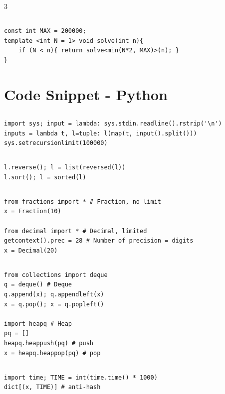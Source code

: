 \documentclass[landscape, 8pt, a4paper, oneside]{extarticle}
\begin{document}
\begin{multicols*}{3}
\subsection{}
\begin{verbatim}
const int MAX = 200000;
template <int N = 1> void solve(int n){
	if (N < n){ return solve<min(N*2, MAX)>(n); }
}
\end{verbatim}
\section{Code Snippet - Python}
\subsection{}
\begin{verbatim}
import sys; input = lambda: sys.stdin.readline().rstrip('\n')
inputs = lambda t, l=tuple: l(map(t, input().split()))
sys.setrecursionlimit(100000)
\end{verbatim}
\subsection{}
\begin{verbatim}
l.reverse(); l = list(reversed(l))
l.sort(); l = sorted(l)
\end{verbatim}
\subsection{}
\begin{verbatim}
from fractions import * # Fraction, no limit
x = Fraction(10)

from decimal import * # Decimal, limited
getcontext().prec = 28 # Number of precision = digits
x = Decimal(20)
\end{verbatim}
\subsection{}
\begin{verbatim}
from collections import deque
q = deque() # Deque
q.append(x); q.appendleft(x)
x = q.pop(); x = q.popleft()

import heapq # Heap
pq = []
heapq.heappush(pq) # push
x = heapq.heappop(pq) # pop
\end{verbatim}
\subsection{}
\begin{verbatim}
import time; TIME = int(time.time() * 1000)
dict[(x, TIME)] # anti-hash
\end{verbatim}

\end{multicols*}
\end{document}

